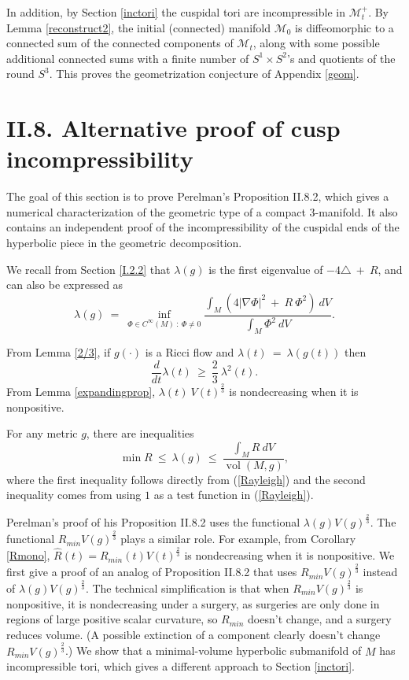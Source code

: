 \documentclass[12pt]{amsart}
\newcommand{\M}{{\mathcal M}}
\newcommand{\vol}{\operatorname{vol}}
\numberwithin{equation}{section}
\theoremstyle{plain}
\theoremstyle{definition}
\theoremstyle{remark}
\begin{document}
In addition, by Section \ref{inctori} 
the cuspidal tori are incompressible in $\M_t^+$.
By Lemma \ref{reconstruct2},
the initial (connected) manifold $\M_0$ is diffeomorphic to a connected sum of
the connected components of $\M_t$, along with some possible additional connected sums
with a finite number of $S^1 \times S^2$'s and quotients of the round $S^3$.
This proves the geometrization conjecture of Appendix \ref{geom}. 

\section{II.8. Alternative proof of cusp incompressibility} \label{II.8}

The goal of this section is to prove Perelman's Proposition II.8.2, which
gives a numerical characterization of
the geometric type of a compact $3$-manifold. It also contains an
independent proof of the incompressibility of the cuspidal ends
of the hyperbolic piece in the geometric decomposition.

We recall from Section \ref{I.2.2}
that $\lambda(g)$ is the first eigenvalue of
$-4 \triangle \: + \: R$, and can also be expressed as
\begin{equation} \label{Rayleigh}
\lambda(g) \: = \: \inf_{\Phi \in C^\infty(M) \: : \:
\Phi \neq 0} \frac{\int_M \left( 4 |\nabla \Phi|^2 \: + \:
R \: \Phi^2 \right) \: dV}{\int_M \Phi^2 \: dV}.
\end{equation}

From Lemma \ref{2/3}, if $g(\cdot)$ is a Ricci flow and
$\lambda(t) \: = \: \lambda(g(t))$ then
\begin{equation} \label{ll}
\frac{d}{dt} \lambda(t) \: \ge \: \frac23 \: 
\lambda^2(t).
\end{equation}
From Lemma \ref{expandingprop},
$\lambda(t) \: V(t)^{\frac23}$ is nondecreasing
when it is nonpositive.

For any metric $g$, there are inequalities
\begin{equation} \label{test}
\min R \: \le \: \lambda(g) \: \le \: \frac{\int_M R \: dV}{\vol(M, g)},
\end{equation}
where the first inequality follows directly from (\ref{Rayleigh})
and the second inequality comes from using $1$ as a
test function in (\ref{Rayleigh}).


Perelman's proof of his Proposition II.8.2 uses the functional
$\lambda(g) V(g)^{\frac23}$. The functional
$R_{min} V(g)^{\frac23}$ plays a similar role.  For example, from
Corollary \ref{Rmono}, 
$\widehat{R}(t) = R_{min}(t) V(t)^{\frac23}$ is nondecreasing
when it is nonpositive. We first give a proof of an analog of
Proposition II.8.2 that uses $R_{min} V(g)^{\frac23}$ instead 
of $\lambda(g) V(g)^{\frac23}$. The technical simplification is that 
when
$R_{min} V(g)^{\frac23}$ is nonpositive, it is nondecreasing under a surgery,
as surgeries are only done in regions of large positive scalar curvature,
so $R_{min}$ doesn't change,
and a surgery reduces volume. (A possible extinction of a component
clearly doesn't change $R_{min} V(g)^{\frac23}$.)
We show that a minimal-volume hyperbolic submanifold of $M$
has incompressible tori, which gives a different approach to
Section \ref{inctori}. 
\end{document}
